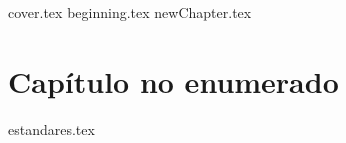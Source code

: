 \documentclass[11pt, twoside]{book}%
\begin{document}
	{cover.tex}%
	\frontmatter
		{beginning.tex}
		\tableofcontents
	\mainmatter
	{newChapter.tex}
	\cleanalldata
	\chapter*{Capítulo no enumerado}
	\appendix
		{estandares.tex}
		\cleanalldata
%	
%	
\end{document}
